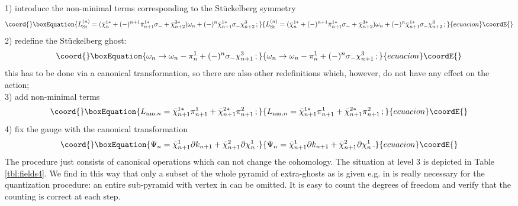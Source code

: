 \documentclass[a4paper,12pt]{article}
\begin{document}
1) introduce the non-minimal terms corresponding to the
St\"uckelberg symmetry
\begin{equation}\coord{}\boxEquation{
  L_{\rm St}^{(n)} = ({\bar \chi}_n^{1*} + (-)^{n+1}
  {\bar\pi}_{n+1}^{1*} \sigma_- 
  + {\bar \chi}_{n+2}^{3*} ) \omega_n + (-)^n {\bar\chi}_{n+1}^{1*} \sigma_- 
  \chi_{n+2}^3 \, ;
}{
  L_{\rm St}^{(n)} = ({\bar \chi}_n^{1*} + (-)^{n+1}
  {\bar\pi}_{n+1}^{1*} \sigma_- 
  + {\bar \chi}_{n+2}^{3*} ) \omega_n + (-)^n {\bar\chi}_{n+1}^{1*} \sigma_- 
  \chi_{n+2}^3 \, ;
}{ecuacion}\coordE{}\end{equation}
2) redefine the St\"uckelberg ghost:
\begin{equation}\coord{}\boxEquation{
  \omega_n \to \omega_n - \pi_n^1 + (-)^n \sigma_- \chi_{n+1}^3 \, ;
}{
  \omega_n \to \omega_n - \pi_n^1 + (-)^n \sigma_- \chi_{n+1}^3 \, ;
}{ecuacion}\coordE{}\end{equation}
this has to be done via a canonical transformation, so there are
also other redefinitions which, however, do not have any effect on the 
action; \\
3) add non-minimal terms
\begin{equation}\coord{}\boxEquation{
  L_{{\rm nm},n} = {\bar\chi}_{n+1}^{1*} \pi_{n+1}^1 + {\bar\chi}_{n+1}^{2*}
  \pi_{n+1}^2 \, ; 
}{
  L_{{\rm nm},n} = {\bar\chi}_{n+1}^{1*} \pi_{n+1}^1 + {\bar\chi}_{n+1}^{2*}
  \pi_{n+1}^2 \, ; 
}{ecuacion}\coordE{}\end{equation}
4) fix the gauge with the canonical transformation
\begin{equation}\coord{}\boxEquation{
  \Psi_n = \bar\chi_{n+1}^1 \partial k_{n+1} +  \bar\chi_{n+1}^2
  \partial \chi_n^1 \, . 
}{
  \Psi_n = \bar\chi_{n+1}^1 \partial k_{n+1} +  \bar\chi_{n+1}^2
  \partial \chi_n^1 \, . 
}{ecuacion}\coordE{}\end{equation}
The procedure just consists of canonical operations which can not
change the cohomology. 
The situation at level 3 is depicted in Table \ref{tbl:fields4}. 
We find in this way that only a subset of the whole pyramid of
extra-ghosts as is given e.g. in \cite{GH} is really necessary for
the quantization procedure: an entire sub-pyramid with
vertex in \coordHE{} can be omitted. 
It is easy to count the degrees of freedom and verify that the
counting is correct at each step. 
\tabcolsep 1pt
\end{document}
